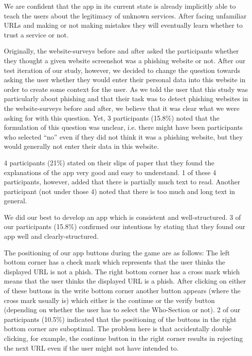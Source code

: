 \begin{description}[leftmargin=0cm]
We are confident that the app in its current state is already implicitly able to teach the users about the legitimacy of unknown services.
After facing unfamiliar URLs and making or not making mistakes they will eventually learn whether to trust a service or not.
	\item[Question to Data Entry] Originally, the website-surveys before and after asked the participants whether they thought a given website screenshot was a phishing website or not.
After our test iteration of our study, however, we decided to change the question towards asking the user whether they would enter their personal data into this website in order to create some context for the user. 
As we told the user that this study was particularly about phishing and that their task was to detect phishing websites in the website-surveys before and after, we believe that it was clear what we were asking for with this question.
Yet, 3 participants (15.8\%) noted that the formulation of this question was unclear, i.e. there might have been participants who selected ``no'' even if they did not think it was a phishing website, but they would  generally not enter their data in this website.
	\item[Explanations and Comprehensibility]
4 participants (21\%) stated on their slips of paper that they found the explanations of the app very good and easy to understand.
1 of these 4 participants, however, added that there is partially much text to read.
Another participant (not under those 4) noted that there is too much and long text in general.
	\item[App Structure]
We did our best to develop an app which is consistent and well-structured.
3 of our participants (15.8\%) confirmed our intentions by stating that they found our app well and clearly-structured.
	\item[Button Positioning] The positioning of our app buttons during the game are as follows: 
The left bottom corner has a check mark which represents that the user thinks the displayed URL is not a phish.
The right bottom corner has a cross mark which means that the user thinks the displayed URL is a phish.
After clicking on either of these buttons in the write bottom corner another button appears (where the cross mark usually is) which either is the continue or the verify button (depending on whether the user has to select the Who-Section or not).
2 of our participants (10.5\%) indicated that the positioning of the buttons in the right bottom corner are suboptimal.
The problem here is that accidentally double clicking, for example, the continue button in the right corner results in rejecting the next URL even if the user might not have intended to.

\end{description}
